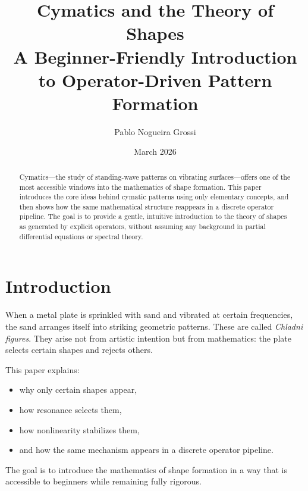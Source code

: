 \documentclass{article}
\begin{document}
\maketitle

\title{\large{Cymatics and the Theory of Shapes}\\
\large A Beginner-Friendly Introduction to Operator-Driven Pattern Formation}\break 

\author{Pablo Nogueira Grossi}
\date{March 2026}

\maketitle

\begin{abstract}
Cymatics---the study of standing-wave patterns on vibrating surfaces---offers one of the most
accessible windows into the mathematics of shape formation. This paper introduces the core ideas
behind cymatic patterns using only elementary concepts, and then shows how the same mathematical
structure reappears in a discrete operator pipeline. The goal is to provide a gentle, intuitive
introduction to the theory of shapes as generated by explicit operators, without assuming any
background in partial differential equations or spectral theory.
\end{abstract}

\section{Introduction}

When a metal plate is sprinkled with sand and vibrated at certain frequencies, the sand arranges
itself into striking geometric patterns. These are called \emph{Chladni figures}. They arise not
from artistic intention but from mathematics: the plate selects certain shapes and rejects others.

This paper explains:
\begin{itemize}
    \item why only certain shapes appear,
    \item how resonance selects them,
    \item how nonlinearity stabilizes them,
    \item and how the same mechanism appears in a discrete operator pipeline.
\end{itemize}

The goal is to introduce the mathematics of shape formation in a way that is accessible to
beginners while remaining fully rigorous.
\end{document}
